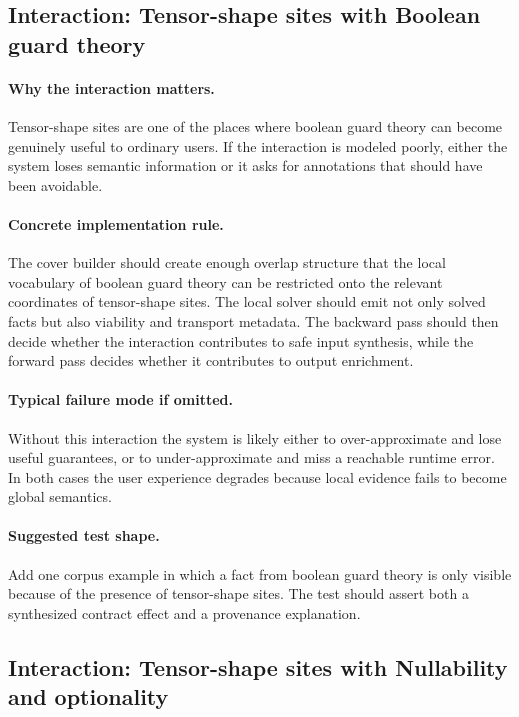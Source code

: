 \documentclass[11pt]{report}
\theoremstyle{definition}
\theoremstyle{plain}
\begin{document}
\subsection{Interaction: Tensor-shape sites with Boolean guard theory}

\paragraph{Why the interaction matters.}
Tensor-shape sites are one of the places where boolean guard theory can become
genuinely useful to ordinary users. If the interaction is modeled poorly,
either the system loses semantic information or it asks for annotations that
should have been avoidable.

\paragraph{Concrete implementation rule.}
The cover builder should create enough overlap structure that the local
vocabulary of boolean guard theory can be restricted onto the relevant
coordinates of tensor-shape sites. The local solver should emit not only
solved facts but also viability and transport metadata. The backward pass
should then decide whether the interaction contributes to safe input
synthesis, while the forward pass decides whether it contributes to output
enrichment.

\paragraph{Typical failure mode if omitted.}
Without this interaction the system is likely either to over-approximate and
lose useful guarantees, or to under-approximate and miss a reachable runtime
error. In both cases the user experience degrades because local evidence
fails to become global semantics.

\paragraph{Suggested test shape.}
Add one corpus example in which a fact from boolean guard theory is only
visible because of the presence of tensor-shape sites. The test should
assert both a synthesized contract effect and a provenance explanation.

\subsection{Interaction: Tensor-shape sites with Nullability and optionality}
\end{document}
